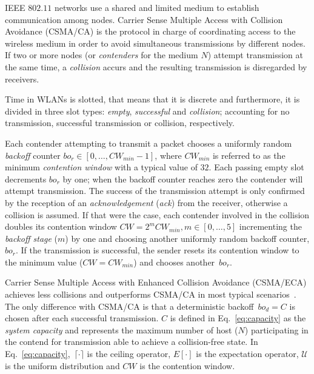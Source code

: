 IEEE $802.11$ networks use a shared and limited medium to establish communication among nodes. Carrier Sense Multiple Access with Collision Avoidance (CSMA/CA) is the protocol in charge of coordinating access to the wireless medium in order to avoid simultaneous transmissions by different nodes. If two or more nodes (or \emph{contenders} for the medium $N$) attempt transmission at the same time, a \emph{collision} accurs and the resulting transmission is disregarded by receivers.

Time in WLANs is slotted, that means that it is discrete and furthermore, it is divided in three slot types: \emph{empty}, \emph{successful} and \emph{collision}; accounting for no transmission, successful transmission or collision, respectively. 

Each contender attempting to transmit a packet chooses a uniformly random \emph{backoff} counter $bo_{r} \in [0,\ldots,CW_{min}-1]$, where $CW_{min}$ is referred to as the minimum \emph{contention window} with a typical value of $32$. Each passing empty slot decrements $bo_{r}$ by one; when the backoff counter reaches zero the contender will attempt transmission. The success of the transmission attempt is only confirmed by the reception of an \emph{acknowledgement} (\emph{ack}) from the receiver, otherwise a collision is assumed. If that were the case, each contender involved in the collision doubles its contention window $CW = 2^{m}CW_{min}, m\in[0,\ldots,5]$ incrementing the \emph{backoff stage} ($m$) by one and choosing another uniformly random backoff counter, $bo_{r}$. If the transmission is successful, the sender resets its contention window to the minimum value ($CW=CW_{min}$) and chooses another~$bo_{r}$.

Carrier Sense Multiple Access with Enhanced Collision Avoidance (CSMA/ECA) achieves less collisions and outperforms CSMA/CA in most typical scenarios~\cite{CSMA_ECA}. The only difference with CSMA/CA is that a deterministic backoff~$bo_{d} = C$ is chosen after each successful transmission. $C$ is defined in Eq.~\ref{eq:capacity} as the \emph{system capacity} and represents the maximum number of host ($N$) participating in the contend for transmission able to achieve a collision-free state. In Eq.~\ref{eq:capacity},~$\lceil{\cdotp}\rceil$ is the ceiling operator, $E[\cdotp]$ is the expectation operator, $\mathcal{U}$ is the uniform distribution and $CW$ is the contention window.


